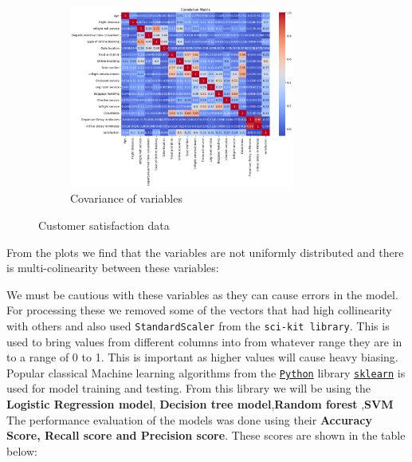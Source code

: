 \documentclass{article}
\begin{document}
\begin{figure}[h]


\begin{subfigure}{0.5\textwidth}
\includegraphics[width=0.9\linewidth, height=6cm]{1.png}
\caption{Covariance of variables}
\label{fig:subim2}
\end{subfigure}

\caption{Customer satisfaction data}
\label{fig:image2}
\end{figure}

From the plots we find that the variables are not uniformly distributed and there is multi-colinearity between these variables:

We must be cautious with these variables as they can cause errors in the model.\\
For processing these we removed some of the vectors that had high collinearity with others and also used \verb|StandardScaler| from the \verb|sci-kit library|. This is used to bring values from different columns into from whatever range they are in to a range of 0 to 1. This is important as higher values will cause heavy biasing.\\
Popular classical Machine learning algorithms from  the {\href{https://www.python.org/}{\texttt{Python}} library \href{https://scikit-learn.org/stable/index.html}{{\texttt{sklearn}}}} is used for model training and testing. From this library we will be using the \textbf{Logistic Regression model}, \textbf{Decision tree model},\textbf{Random forest },\textbf{SVM}
The performance evaluation of the models was done using their \textbf{Accuracy Score, Recall score and Precision score}. These scores are shown in the table below: 
\end{document}
